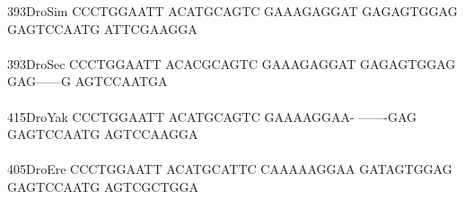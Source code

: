 \documentclass[11pt,twoside,reqno,a4paper]{article}
\begin{document}
{393\hspace*{1\charwidth}DroSim	CCCTGGAATT	ACATGCAGTC	GAAAGAGGAT	GAGAGTGGAG	GAGTCCAATG	ATTCGAAGGA	\\
\hspace*{4\charwidth}\hspace*{7\charwidth}\hspace*{1\charwidth}\hspace*{1\charwidth}\hspace*{1\charwidth}\hspace*{1\charwidth}\hspace*{1\charwidth}\hspace*{1\charwidth}\\
393\hspace*{1\charwidth}DroSec	CCCTGGAATT	ACACGCAGTC	GAAAGAGGAT	GAGAGTGGAG	GAG------G	AGTCCAATGA	\\
\hspace*{4\charwidth}\hspace*{7\charwidth}\hspace*{1\charwidth}\hspace*{1\charwidth}\hspace*{1\charwidth}\hspace*{1\charwidth}\hspace*{1\charwidth}\hspace*{1\charwidth}\\
415\hspace*{1\charwidth}DroYak	CCCTGGAATT	ACATGCAGTC	GAAAAGGAA-	-------GAG	GAGTCCAATG	AGTCCAAGGA	\\
\hspace*{4\charwidth}\hspace*{7\charwidth}\hspace*{1\charwidth}\hspace*{1\charwidth}\hspace*{1\charwidth}\hspace*{1\charwidth}\hspace*{1\charwidth}\hspace*{1\charwidth}\\
405\hspace*{1\charwidth}DroEre	CCCTGGAATT	ACATGCATTC	CAAAAAGGAA	GATAGTGGAG	GAGTCCAATG	AGTCGCTGGA	\\
\hspace*{4\charwidth}\hspace*{7\charwidth}\hspace*{1\charwidth}\hspace*{1\charwidth}\hspace*{1\charwidth}\hspace*{1\charwidth}\hspace*{1\charwidth}\hspace*{1\charwidth}\\
}
\end{document}
